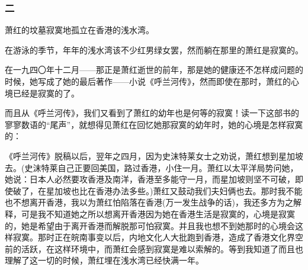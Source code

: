 \subsubsection*{二}
\par 萧红的坟墓寂寞地孤立在香港的浅水湾。
\par 在游泳的季节，年年的浅水湾该不少红男绿女罢，然而躺在那里的萧红是寂寞的。
\par 在一九四〇年十二月——那正是萧红逝世的前年，那是她的健康还不怎样成问题的时候，她写成了她的最后著作——小说《呼兰河传》，然而即使在那时，萧红的心境已经是寂寞的了。
\par 而且从《呼兰河传》，我们又看到了萧红的幼年也是何等的寂寞！读一下这部书的寥寥数语的“尾声”，就想得见萧红在回忆她那寂寞的幼年时，她的心境是怎样寂寞的：
\par 《呼兰河传》脱稿以后，翌年之四月，因为史沫特莱女士之劝说，萧红想到星加坡去。(史沫特莱自己正要回美国，路过香港，小住一月。萧红以太平洋局势问她，她说：日本人必然要攻香港及南洋，香港至多能守一月，而星加坡则坚不可破，即使破了，在星加坡也比在香港办法多些。)萧红又鼓动我们夫妇俩也去。那时我不能也不想离开香港，我以为萧红怕陷落在香港(万一发生战争的话)，我还多方为之解释，可是我不知道她之所以想离开香港因为她在香港生活是寂寞的，心境是寂寞的，她是希望由于离开香港而解脱那可怕寂寞。并且我也想不到她那时的心境会这样寂寞。那时正在皖南事变以后，内地文化人大批跑到香港，造成了香港文化界空前的活跃，在这样环境中，而萧红会感到寂寞是难以索解的。等到我知道了而且也理解了这一切的时候，萧红埋在浅水湾已经快满一年。
